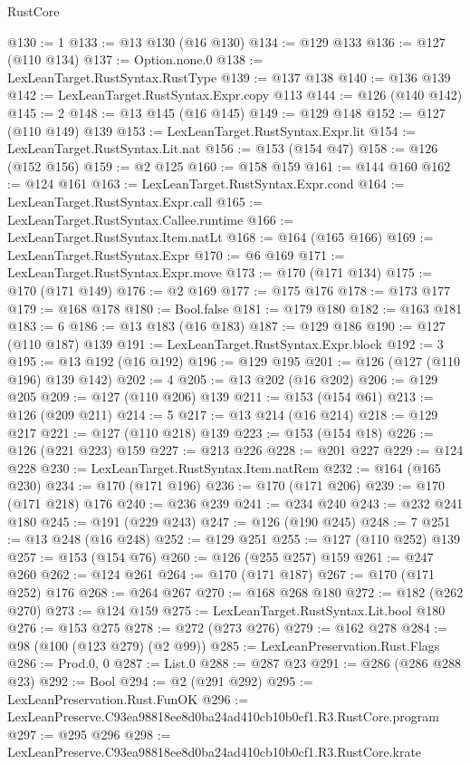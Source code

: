 \begin{lexlean}{RustCore}
\begin{coremodule}
@130 := 1
@133 := @13 @130 (@16 @130)
@134 := @129 @133
@136 := @127 (@110 @134)
@137 := Option.none.{0}
@138 := LexLeanTarget.RustSyntax.RustType
@139 := @137 @138
@140 := @136 @139
@142 := LexLeanTarget.RustSyntax.Expr.copy @113
@144 := @126 (@140 @142)
@145 := 2
@148 := @13 @145 (@16 @145)
@149 := @129 @148
@152 := @127 (@110 @149) @139
@153 := LexLeanTarget.RustSyntax.Expr.lit
@154 := LexLeanTarget.RustSyntax.Lit.nat
@156 := @153 (@154 @47)
@158 := @126 (@152 @156)
@159 := @2 @125
@160 := @158 @159
@161 := @144 @160
@162 := @124 @161
@163 := LexLeanTarget.RustSyntax.Expr.cond
@164 := LexLeanTarget.RustSyntax.Expr.call
@165 := LexLeanTarget.RustSyntax.Callee.runtime
@166 := LexLeanTarget.RustSyntax.Item.natLt
@168 := @164 (@165 @166)
@169 := LexLeanTarget.RustSyntax.Expr
@170 := @6 @169
@171 := LexLeanTarget.RustSyntax.Expr.move
@173 := @170 (@171 @134)
@175 := @170 (@171 @149)
@176 := @2 @169
@177 := @175 @176
@178 := @173 @177
@179 := @168 @178
@180 := Bool.false
@181 := @179 @180
@182 := @163 @181
@183 := 6
@186 := @13 @183 (@16 @183)
@187 := @129 @186
@190 := @127 (@110 @187) @139
@191 := LexLeanTarget.RustSyntax.Expr.block
@192 := 3
@195 := @13 @192 (@16 @192)
@196 := @129 @195
@201 := @126 (@127 (@110 @196) @139 @142)
@202 := 4
@205 := @13 @202 (@16 @202)
@206 := @129 @205
@209 := @127 (@110 @206) @139
@211 := @153 (@154 @61)
@213 := @126 (@209 @211)
@214 := 5
@217 := @13 @214 (@16 @214)
@218 := @129 @217
@221 := @127 (@110 @218) @139
@223 := @153 (@154 @18)
@226 := @126 (@221 @223) @159
@227 := @213 @226
@228 := @201 @227
@229 := @124 @228
@230 := LexLeanTarget.RustSyntax.Item.natRem
@232 := @164 (@165 @230)
@234 := @170 (@171 @196)
@236 := @170 (@171 @206)
@239 := @170 (@171 @218) @176
@240 := @236 @239
@241 := @234 @240
@243 := @232 @241 @180
@245 := @191 (@229 @243)
@247 := @126 (@190 @245)
@248 := 7
@251 := @13 @248 (@16 @248)
@252 := @129 @251
@255 := @127 (@110 @252) @139
@257 := @153 (@154 @76)
@260 := @126 (@255 @257) @159
@261 := @247 @260
@262 := @124 @261
@264 := @170 (@171 @187)
@267 := @170 (@171 @252) @176
@268 := @264 @267
@270 := @168 @268 @180
@272 := @182 (@262 @270)
@273 := @124 @159
@275 := LexLeanTarget.RustSyntax.Lit.bool @180
@276 := @153 @275
@278 := @272 (@273 @276)
@279 := @162 @278
@284 := @98 (@100 (@123 @279) (@2 @99))
@285 := LexLeanPreservation.Rust.Flags
@286 := Prod.{0, 0}
@287 := List.{0}
@288 := @287 @23
@291 := @286 (@286 @288 @23)
@292 := Bool
@294 := @2 (@291 @292)
@295 := LexLeanPreservation.Rust.FunOK
@296 := LexLeanPreserve.C93ea98818ee8d0ba24ad410cb10b0cf1.R3.RustCore.program
@297 := @295 @296
@298 := LexLeanPreserve.C93ea98818ee8d0ba24ad410cb10b0cf1.R3.RustCore.krate

\end{coremodule}
\end{lexlean}
